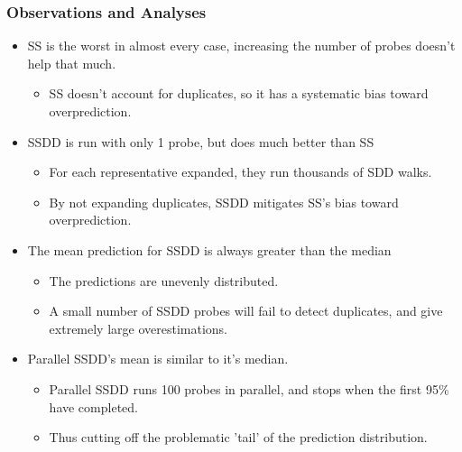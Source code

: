 \documentclass{beamer}
\begin{document}
\begin{frame}
  \frametitle{Observations and Analyses}
  \begin{itemize}
  \item SS is the worst in almost every case, increasing the number of probes doesn't help that much.
    \begin{itemize}
    \item SS doesn't account for duplicates, so it has a systematic bias toward overprediction.
    \end{itemize}
  \item SSDD is run with only 1 probe, but does much better than SS
    \begin{itemize}
    \item For each representative expanded, they run thousands of SDD walks.
    \item By not expanding duplicates, SSDD mitigates SS's bias toward overprediction.
    \end{itemize}
  \item The mean prediction for SSDD is always greater than the median
    \begin{itemize}
    \item The predictions are unevenly distributed.
    \item A small number of SSDD probes will fail to detect duplicates, and give extremely large overestimations.
    \end{itemize}
  
  \item Parallel SSDD's mean is similar to it's median.
    \begin{itemize}
    \item Parallel SSDD runs 100 probes in parallel, and stops when the first 95\% have completed.
    \item Thus cutting off the problematic 'tail' of the prediction distribution.
    \end{itemize}
    
  \end{itemize}
\end{frame}
\end{document}
